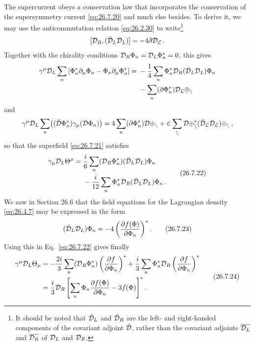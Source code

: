 The supercurrent obeys a conservation law that incorporates the conservation
of the supersymmetry current \eqref{eq:26.7.20} and much else besides. To
derive it, we may use the anticommutation relation \eqref{eq:26.2.30} to
write\footnote{It should be noted that \(\bar{\mathcal{D}}_L\) and
\(\bar{\mathcal{D}}_R\) are the left- and right-handed components of the
covariant adjoint \(\bar{\mathcal{D}}\), rather than the covariant adjoints
\(\overline{\mathcal{D}_L}\) and \(\overline{\mathcal{D}_R}\) of \(\mathcal{D}_L\) and
\(\mathcal{D}_R\).}
\[
  [\mathcal{D}_R,(\bar{\mathcal{D}}_L\mathcal{D}_L)]
  =-4\sl{\partial}\mathcal{D}_L\,.
\]
Together with the chirality conditions
\(\mathcal{D}_R\Phi_n=\mathcal{D}_L\Phi_n^*=0\), this gives
\[
  \begin{aligned}
  \gamma^\mu\mathcal{D}_L\sum_n
  \left[\Phi_n^*\partial_\mu\Phi_n
       -\Phi_n\partial_\mu\Phi_n^*\right]
  ={}&-\frac14\sum_n
      \Phi_n^*\mathcal{D}_R(\bar{\mathcal{D}}_L\mathcal{D}_L)\Phi_n
  \\
     &-\sum_n(\sl{\partial}\Phi_n^*)\mathcal{D}_L\Phi_n
  \end{aligned}
\]
and
\[
  \gamma^\mu\mathcal{D}_L\sum_n
  \bigl((\bar{\mathcal{D}}\Phi_n^*)\gamma_\mu(\mathcal{D}\Phi_n)\bigr)
  =4\sum_n(\sl{\partial}\Phi_n^*)\mathcal{D}\Phi_n
   +2\sum_n\mathcal{D}\Phi_n^*
      (\bar{\mathcal{D}}_L\mathcal{D}_L)\Phi_n\,,
\]
so that the superfield \eqref{eq:26.7.21} satisfies
\begin{equation}
  \begin{aligned}
  \gamma_\mu\mathcal{D}_L\Theta^\mu
  ={}&\frac{i}{6}\sum_n
      (\mathcal{D}_R\Phi_n^*)(\bar{\mathcal{D}}_L\mathcal{D}_L)\Phi_n
  \\
     &-\frac{i}{12}\sum_n
      \Phi_n^*\mathcal{D}_R(\bar{\mathcal{D}}_L\mathcal{D}_L)\Phi_n\,.
  \end{aligned}
  \tag{26.7.22}\label{eq:26.7.22}
\end{equation}
We saw in Section 26.6 that the field equations for the Lagrangian density
\eqref{eq:26.4.7} may be expressed in the form
\begin{equation}
  (\bar{\mathcal{D}}_L\mathcal{D}_L)\Phi_n
  =-4\left(\frac{\partial f(\Phi)}{\partial\Phi_n}\right)^* .
  \tag{26.7.23}\label{eq:26.7.23}
\end{equation}
Using this in Eq.~\eqref{eq:26.7.22} gives finally
\begin{equation}
  \begin{aligned}
  \gamma^\mu\mathcal{D}_L\Theta_\mu
  &=-\frac{2i}{3}\sum_n
    (\mathcal{D}_R\Phi_n^*)
    \left(\frac{\partial f}{\partial\Phi_n}\right)^*
   +\frac{i}{3}\sum_n
    \Phi_n^*\mathcal{D}_R
    \left(\frac{\partial f}{\partial\Phi_n}\right)^*
  \\
  &=\frac{i}{3}\mathcal{D}_R
    \left[
      \sum_n\Phi_n\frac{\partial f(\Phi)}{\partial\Phi_n}
      -3f(\Phi)
    \right]^* .
  \end{aligned}
  \tag{26.7.24}\label{eq:26.7.24}
\end{equation}
